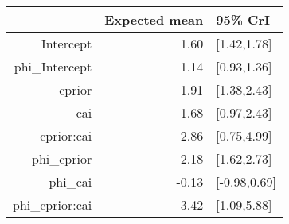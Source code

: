 \begin{tabular}{rrl}
  \hline
 & Expected mean & 95\% CrI \\ 
  \hline
Intercept & 1.60 & [1.42,1.78] \\ 
  phi\_Intercept & 1.14 & [0.93,1.36] \\ 
  cprior & 1.91 & [1.38,2.43] \\ 
  cai & 1.68 & [0.97,2.43] \\ 
  cprior:cai & 2.86 & [0.75,4.99] \\ 
  phi\_cprior & 2.18 & [1.62,2.73] \\ 
  phi\_cai & -0.13 & [-0.98,0.69] \\ 
  phi\_cprior:cai & 3.42 & [1.09,5.88] \\ 
   \hline
\end{tabular}

